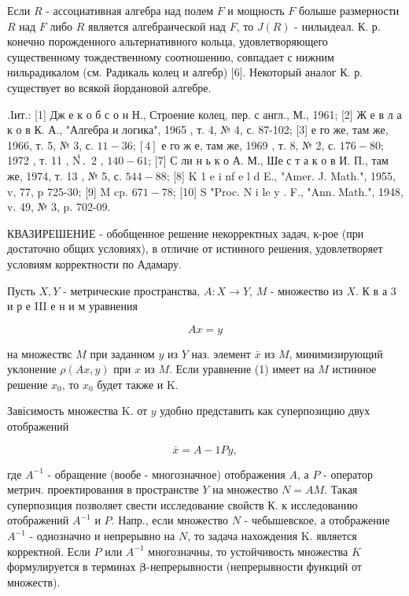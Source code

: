 \documentclass[10pt]{article}
\begin{document}
Если $R$ - ассоциативная алгебра над полем $F$ и мощность $F$ болыше размерности $R$ над $F$ либо $R$ является алгебраической над $F$, то $J(R)$ - нильидеал. К. р. конечно порожденного альтернативного кольца, удовлетворяющего существенному тождественному соотношению, совпадает с нижним нильрадикалом (см. Радикаль колец и алгебр) [6]. Некоторый аналог К. р. существует во всякой йордановой алгебре.



.Iит.: [1] Дж е к о б с о н Н., Строение колец, пер. с англ., М., 1961; [2] Ж е в л а к о в К. А., "Алгебра и логика", 1965 , т. 4, № 4, с. 87-102; [3] е го же, там же, 1966, т. 5, № 3, с. $11-36 ;[4]$ е го ж е, там же, 1969 , т. 8, № 2, с. $176-80$; 1972 , т. 11 , Nํ․ 2 , $140-61$; [7] С ли н ь к о А. М., Ше с т а к о в И. П., там же, 1974, т. 13 , № 5, с. $544-88$; [8] K 1 e i nf e l d E., "Amer. J. Math.", 1955, v, 77, p 725-30; [9] M cp. $671-78$; [10] S "Proc. N i le y . F., "Ann. Math.", 1948, v. 49, № 3, p. 702-09.



КВАЗИРЕШЕНИЕ - обобщенное решение некорректных задач, к-рое (при достаточно общих условиях), в отличие от истинного решения, удовлетворяет условиям корректности по Адамару.



Пусть $X, Y$ - метрические пространства, $A: X \rightarrow Y$, $M$ - множество из $X$. К в а 3 и р е III е н и м уравнения



\[

A x=y

\]



на множествс $M$ при заданном $y$ из $Y$ наз. элемент $\bar{x}$ из $M$, минимизирующий уклонение $\rho(A x, y)$ при $x$ из $M$. Если уравнение (1) имеет на $M$ истинное решение $x_{0}$, то $x_{0}$ будет также и $\mathrm{K}$.



Завісимость множества $\mathrm{K}$. от $y$ удобно представить как суперпозицию двух отображений



\[

\bar{x}=A-1 P y,

\]



где $A^{-1}$ - обращение (вообе - многозначное) отображения $A$, а $P$ - оператор метрич. проектирования в пространстве $Y$ на множество $N=A M$. Такая суперпозиция позволяет свести исследование свойств К. к исследованию отображений $A^{-1}$ и $P$. Напр., если множество $N$ - чебышевское, а отображение $A^{-1}$ - однозначно и непрерывно на $N$, то задача нахождения $\mathrm{K}$. является корректной. Если $P$ или $A^{-1}$ многозначны, то устойчивость множества $K$ формулируется в терминах $\boldsymbol{\beta}$-непрерывности (непрерывности функций от множеств).
\end{document}
